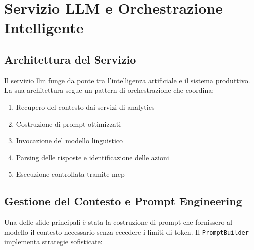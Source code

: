 \section{Servizio LLM e Orchestrazione Intelligente}
\label{sec:llm_service}

\subsection{Architettura del Servizio}
Il servizio \gls{llm} funge da ponte tra l'intelligenza artificiale e il sistema produttivo. La sua architettura segue un pattern di orchestrazione che coordina:
\begin{enumerate}
    \item Recupero del contesto dai servizi di analytics
    \item Costruzione di prompt ottimizzati
    \item Invocazione del modello linguistico
    \item Parsing delle risposte e identificazione delle azioni
    \item Esecuzione controllata tramite \gls{mcp}
\end{enumerate}

\subsection{Gestione del Contesto e Prompt Engineering}
Una delle sfide principali è stata la costruzione di prompt che fornissero al modello il contesto necessario senza eccedere i limiti di token. Il \texttt{PromptBuilder} implementa strategie sofisticate:

